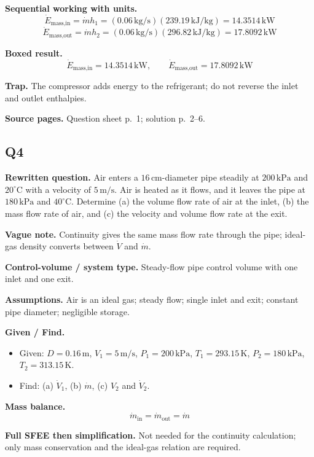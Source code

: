\textbf{Sequential working with units.}
\[
\dot E_{\text{mass,in}} = \dot m h_1 = (0.06\,\text{kg/s})(239.19\,\text{kJ/kg}) = 14.3514\,\text{kW}
\]
\[
\dot E_{\text{mass,out}} = \dot m h_2 = (0.06\,\text{kg/s})(296.82\,\text{kJ/kg}) = 17.8092\,\text{kW}
\]

\textbf{Boxed result.}
\[
\boxed{\dot E_{\text{mass,in}} = 14.3514\,\text{kW}, \qquad \dot E_{\text{mass,out}} = 17.8092\,\text{kW}}
\]

\textbf{Trap.} The compressor adds energy to the refrigerant; do not reverse the inlet and outlet enthalpies.

\textbf{Source pages.} Question sheet p.~1; solution p.~2--6.

\subsection*{Q4}
\textbf{Rewritten question.} Air enters a $16\,\text{cm}$-diameter pipe steadily at $200\,\text{kPa}$ and $20^\circ\text{C}$ with a velocity of $5\,\text{m/s}$. Air is heated as it flows, and it leaves the pipe at $180\,\text{kPa}$ and $40^\circ\text{C}$. Determine (a) the volume flow rate of air at the inlet, (b) the mass flow rate of air, and (c) the velocity and volume flow rate at the exit.

\textbf{Vague note.} Continuity gives the same mass flow rate through the pipe; ideal-gas density converts between $\dot V$ and $\dot m$.

\textbf{Control-volume / system type.} Steady-flow pipe control volume with one inlet and one exit.

\textbf{Assumptions.} Air is an ideal gas; steady flow; single inlet and exit; constant pipe diameter; negligible storage.

\textbf{Given / Find.}
\begin{itemize}
  \item Given: $D=0.16\,\text{m}$, $V_1=5\,\text{m/s}$, $P_1=200\,\text{kPa}$, $T_1=293.15\,\text{K}$, $P_2=180\,\text{kPa}$, $T_2=313.15\,\text{K}$.
  \item Find: (a) $\dot V_1$, (b) $\dot m$, (c) $V_2$ and $\dot V_2$.
\end{itemize}

\textbf{Mass balance.}
\[
\dot m_{\text{in}}=\dot m_{\text{out}}=\dot m
\]

\textbf{Full SFEE then simplification.} Not needed for the continuity calculation; only mass conservation and the ideal-gas relation are required.

